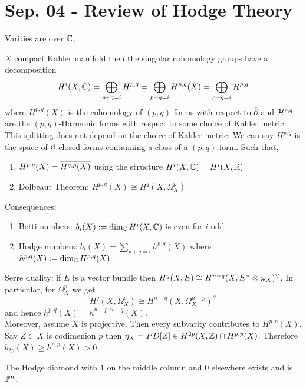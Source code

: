 \documentclass[12pt]{article}
\newcommand{\dbar}{\bar{\partial}}
\begin{document}
 
\section{Sep. 04 - Review of Hodge Theory}

Varities are over $\CC$.


\begin{theorem}
$X$ compact Kahler manifold then the singular cohomology groups have a decomposition
\[ H^i(X, \CC) = \bigoplus_{p + q = i} H^{p,q} = \bigoplus_{p + q = i} H^{p,q}(X) = \bigoplus_{p + q = i} \cH^{p,q} \]
where $H^{p,q}(X)$ is the cohomology of $(p,q)$-forms with respect to $\dbar$ and $\cH^{p,q}$ are the $(p,q)$-Harmonic forms with respect to some choice of Kahler metric. This splitting does not depend on the choice of Kahler metric. We can say $H^{p,q}$ is the space of $\d$-closed forms containiing a class of a $(p,q)$-form. Such that,
\begin{enumerate}
\item $H^{p,q}(X) = \ol{H^{q,p}(X)}$ using the structure $H^i(X, \CC) = H^i(X, \RR)$
\item Dolbeaut Theorem: $H^{p,q}(X) \cong H^q(X, \Omega^p_X)$ 
\end{enumerate} 
\end{theorem} 

Consequences:
\begin{enumerate}
\item Betti numbers: $b_i(X) := \dim_{\CC} H^i(X, \CC)$ is even for $i$ odd
\item Hodge numbers: $b_i(X) = \sum_{p+q = i} h^{p,q}(X)$ where $h^{p,q}(X) := \dim_{\CC} H^{p,q}(X)$
\end{enumerate}

Serre duality: if $E$ is a vector bundle then $H^q(X, E) \cong H^{n-q}(X, E^\vee \ot \omega_X)^\vee$. In particular, for $\Omega_X^p$ we get
\[ H^q(X, \Omega_X^p) \cong H^{n-q}(X, \Omega_X^{n-p})^\vee \]
and hence $h^{p,q}(X) = h^{n-p,n-q}(X)$. 
\bigskip\\
Moreover, assume $X$ is projective. Then every subvarity contributes to $H^{p,p}(X)$. Say $Z \subset X$ is codimenion $p$ then $\eta_X = PD[Z] \in H^{2p}(X, \Z) \cap H^{p,p}(X)$. Therefore $b_{2p}(X) \ge h^{p,p}(X) > 0$. 

\begin{example}
The Hodge diamond with $1$ on the middle column and 0 elsewhere exists and is $\P^n$. 
\end{example}
\end{document}
